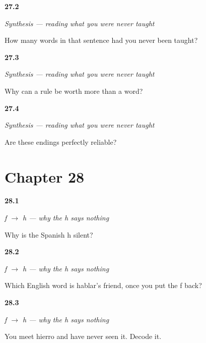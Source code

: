 \noindent\begin{minipage}[t]{\linewidth}
\raggedright
\hypertarget{review-ES-C56-sintesis-leer-count}{\textbf{27.2}} \emph{Synthesis — reading what you were never taught}\par
\small How many words in that sentence had you never been taught?
\end{minipage}\par\medskip

\noindent\begin{minipage}[t]{\linewidth}
\raggedright
\hypertarget{review-ES-C56-sintesis-leer-shape}{\textbf{27.3}} \emph{Synthesis — reading what you were never taught}\par
\small Why can a rule be worth more than a word?
\end{minipage}\par\medskip

\noindent\begin{minipage}[t]{\linewidth}
\raggedright
\hypertarget{review-ES-C56-sintesis-leer-limit}{\textbf{27.4}} \emph{Synthesis — reading what you were never taught}\par
\small Are these endings perfectly reliable?
\end{minipage}\par\medskip

\section*{Chapter 28}

\noindent\begin{minipage}[t]{\linewidth}
\raggedright
\hypertarget{review-ES-C57-f-a-h-why}{\textbf{28.1}} \emph{f $\to$ h — why the h says nothing}\par
\small Why is the Spanish h silent?
\end{minipage}\par\medskip

\noindent\begin{minipage}[t]{\linewidth}
\raggedright
\hypertarget{review-ES-C57-f-a-h-hablar}{\textbf{28.2}} \emph{f $\to$ h — why the h says nothing}\par
\small Which English word is hablar's friend, once you put the f back?
\end{minipage}\par\medskip

\noindent\begin{minipage}[t]{\linewidth}
\raggedright
\hypertarget{review-ES-C57-f-a-h-decode}{\textbf{28.3}} \emph{f $\to$ h — why the h says nothing}\par
\small You meet hierro and have never seen it. Decode it.
\end{minipage}\par\medskip

